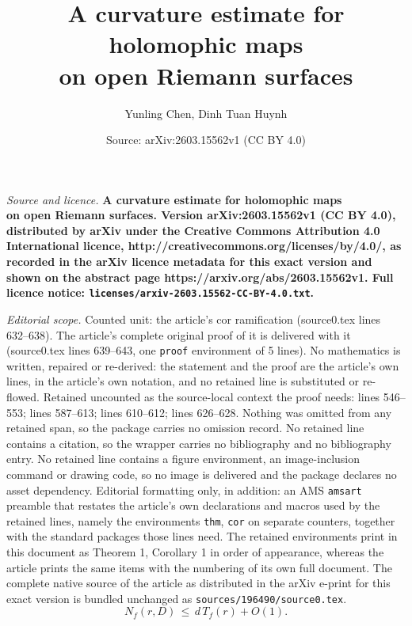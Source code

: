\documentclass[10pt,a4paper]{amsart}
\title{\bf A curvature estimate for holomophic maps\\ on open Riemann surfaces}
\author{Yunling Chen, Dinh Tuan Huynh}
\date{Source: arXiv:2603.15562v1 (CC BY 4.0)}
\begin{document}
\maketitle

\noindent\emph{Source and licence.} \bf A curvature estimate for holomophic maps\\ on open Riemann surfaces. Version arXiv:2603.15562v1 (CC BY 4.0), distributed by arXiv under the Creative Commons Attribution 4.0 International licence, http://creativecommons.org/licenses/by/4.0/, as recorded in the arXiv licence metadata for this exact version and shown on the abstract page https://arxiv.org/abs/2603.15562v1. Full licence notice: \texttt{licenses/arxiv-2603.15562-CC-BY-4.0.txt}.\par\smallskip

\noindent\textit{Editorial scope.} Counted unit: the article's cor ramification (source0.tex lines 632--638). The article's complete original proof of it is delivered with it (source0.tex lines 639--643, one \texttt{proof} environment of 5 lines). No mathematics is written, repaired or re-derived: the statement and the proof are the article's own lines, in the article's own notation, and no retained line is substituted or re-flowed.  Retained uncounted as the source-local context the proof needs: lines 546--553; lines 587--613; lines 610--612; lines 626--628.  Nothing was omitted from any retained span, so the package carries no omission record.  No retained line contains a citation, so the wrapper carries no bibliography and no bibliography entry.  No retained line contains a figure environment, an image-inclusion command or drawing code, so no image is delivered and the package declares no asset dependency.  Editorial formatting only, in addition: an AMS \texttt{amsart} preamble that restates the article's own declarations and macros used by the retained lines, namely the environments \texttt{thm}, \texttt{cor} on separate counters, together with the standard packages those lines need.  The retained environments print in this document as Theorem 1, Corollary 1 in order of appearance, whereas the article prints the same items with the numbering of its own full document.  The complete native source of the article as distributed in the arXiv e-print for this exact version is bundled unchanged as \texttt{sources/196490/source0.tex}.
	\begin{equation}
		\label{-fmt-inequality}
		N_f(r,D)
		\,
		\leq
		\,
		d\,T_f(r)+O(1).
	\end{equation}
\end{document}
